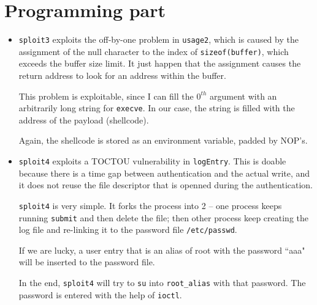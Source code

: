\documentclass[12pt]{article}
\begin{document}
\section*{Programming part}
\begin{itemize}
\item
{\tt sploit3} exploits the off-by-one problem in {\tt usage2}, which is caused by the assignment of the null character to the index of {\tt sizeof(buffer)}, which exceeds the buffer size limit.
It just happen that the assignment causes the return address to look for an address within the buffer.

This problem is exploitable, since I can fill the $0^{th}$ argument with an arbitrarily long string for {\tt execve}.
In our case, the string is filled with the address of the payload (shellcode).

Again, the shellcode is stored as an environment variable, padded by NOP's.

\item
{\tt sploit4} exploits a TOCTOU vulnerability in {\tt logEntry}.
This is doable because there is a time gap between authentication and the actual write, and it does not reuse the file descriptor that is openned during the authentication.

{\tt sploit4} is very simple.
It forks the process into 2 -- one process keeps running {\tt submit} and then delete the file; then other process keep creating the log file and re-linking it to the password file {\tt /etc/passwd}.

If we are lucky, a user entry that is an alias of root with the password ``aaa" will be inserted to the password file.

In the end, {\tt sploit4} will try to {\tt su} into {\tt root\_alias} with that password.
The password is entered with the help of {\tt ioctl}.
\end{itemize}
\end{document}
